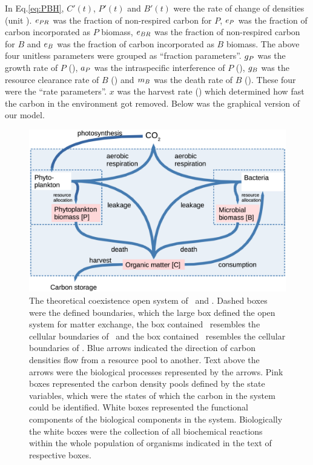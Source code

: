 \documentclass[../thesis.tex]{subfiles} %
\begin{document}
In Eq.\ref{eq:PBH}, $C'(t)$, $P'(t)$ and $B'(t)$ were the rate of change of densities (unit \dxdt).  $e_{PR}$ was the fraction of non-respired carbon for $P$, $e_P$ was the fraction of carbon incorporated as $P$ biomass, $e_{BR}$ was the fraction of non-respired carbon for $B$ and $e_B$ was the fraction of carbon incorporated as $B$ biomass.  The above four unitless parameters were grouped as “fraction parameters”.  $g_P$ was the growth rate of $P$ (\dayU), $a_P$ was the intraspecific interference of $P$ (\denI), $g_B$ was the resource clearance rate of $B$  (\denI) and $m_B$ was the death rate of $B$ (\dayU).  These four were the “rate parameters”.  $x$ was the harvest rate (\dayU) which determined how fast the carbon in the environment got removed.  Below was the graphical version of our model.

\begin{figure}[H]
    \centering
    \includegraphics[width=.8\linewidth]{media/model.png}
    \caption[Model visualization]{The theoretical coexistence open system of \phy\ and \bac.  Dashed boxes were the defined boundaries, which the large box defined the open system for matter exchange, the box contained \phy\ resembles the cellular boundaries of \phy\ and the box contained \bac\ resembles the cellular boundaries of \bac.  Blue arrows indicated the direction of carbon densities flow from a resource pool to another.  Text above the arrows were the biological processes represented by the arrows.  Pink boxes represented the carbon density pools defined by the state variables, which were the states of which the carbon in the system could be identified.  White boxes represented the functional components of the biological components in the system.  Biologically the white boxes were the collection of all biochemical reactions within the whole population of organisms indicated in the text of respective boxes.}
    \label{f:model}
\end{figure}
\end{document}
